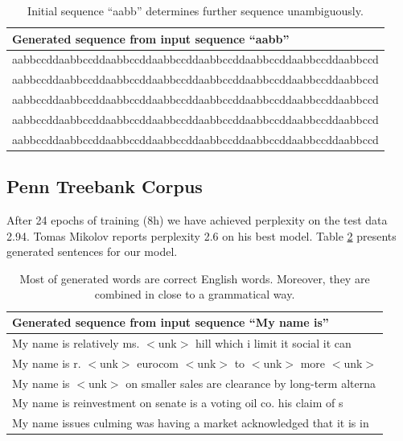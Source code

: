 \documentclass{article}
\begin{document}
\begin{table}[t]
\tiny
\centering
\begin{tabular}{l}
\hline
Generated sequence from input sequence ``aabb'' \\
\hline
 aabbccddaabbccddaabbccddaabbccddaabbccddaabbccddaabbccddaabbccd\\
 aabbccddaabbccddaabbccddaabbccddaabbccddaabbccddaabbccddaabbccd\\
 aabbccddaabbccddaabbccddaabbccddaabbccddaabbccddaabbccddaabbccd\\
 aabbccddaabbccddaabbccddaabbccddaabbccddaabbccddaabbccddaabbccd\\
 aabbccddaabbccddaabbccddaabbccddaabbccddaabbccddaabbccddaabbccd\\
\hline
\end{tabular}
\caption{Initial sequence ``aabb'' determines further sequence unambiguously.}
        \label{tab:aabb}
\end{table}



\subsection{Penn Treebank Corpus}
After 24 epochs of training (8h) we have achieved perplexity on the test data 2.94. 
Tomas Mikolov reports perplexity 2.6 on his best model.
Table \ref{tab:penn} presents generated sentences for our model.


\begin{table}[t]
\tiny
\centering
\begin{tabular}{l}
\hline
Generated sequence from input sequence ``My name is'' \\
\hline
My name is relatively ms. $<$unk$>$ hill which i limit it social it can \\
My name is r. $<$unk$>$ eurocom $<$unk$>$ to $<$unk$>$ more $<$unk$>$ \\
My name is $<$unk$>$ on smaller sales are clearance by long-term alterna\\
My name is reinvestment on senate is a voting oil co. his claim of s\\
My name issues culming was having a market acknowledged that it is in \\

\hline
\end{tabular}
\caption{Most of generated words are correct English words. Moreover, they
are combined in close to a grammatical way.}
        \label{tab:penn}
\end{table}
\end{document}
